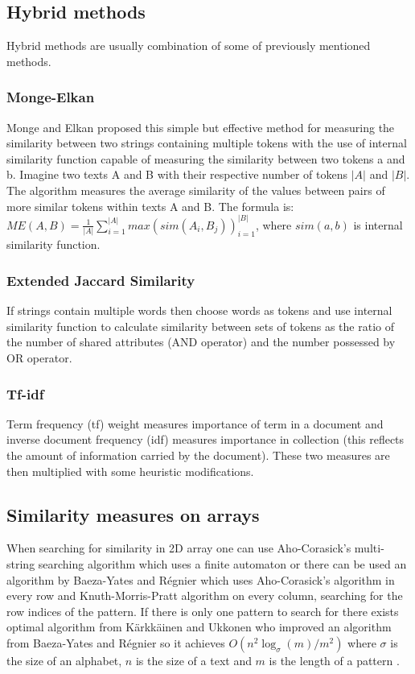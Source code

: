 \subsection{Hybrid methods}
Hybrid methods are usually combination of some of previously mentioned methods.
\subsubsection{Monge-Elkan}
Monge and Elkan proposed this simple but effective method for measuring the similarity between two strings containing multiple tokens with the use of internal similarity function capable of measuring the similarity between two tokens a and b. 
Imagine two texts A and B with their respective number of tokens $\lvert A \rvert$ and $\lvert B\rvert$. 
The algorithm measures the average similarity of the values between pairs of more similar tokens within texts A and B. 
The formula is: 
$ME(A,B)=\frac{1}{\lvert A \rvert} \sum_{i=1}^{\lvert A \rvert} max (sim(A_i, B_j))_{i=1}^{\lvert B\rvert}$, where $sim(a, b)$ is internal similarity function.
\subsubsection{Extended Jaccard Similarity}
If strings contain multiple words then choose words as tokens and use internal similarity function to calculate similarity between sets of tokens as the ratio of the number of shared attributes (AND operator) and the number possessed by OR operator.
\subsubsection{Tf-idf}
Term frequency (tf) weight measures importance of term in a document and inverse document frequency (idf) measures importance in collection (this reflects the amount of information carried by the document). These two measures are then multiplied with some heuristic modifications.

\subsection{Similarity measures on arrays}
When searching for similarity in 2D array one can use Aho-Corasick's multi-string searching algorithm \cite{ahocor} which uses a finite automaton or there can be used an algorithm by Baeza-Yates and R{\' e}gnier \cite{baeza1993fast} which uses Aho-Corasick's algorithm in every row and Knuth-Morris-Pratt algorithm on every column, searching for the row indices of the pattern. If there is only one pattern to search for there exists optimal algorithm from K{\"a}rkk{\"a}inen and Ukkonen who improved an algorithm from Baeza-Yates and R{\' e}gnier so it achieves $O(n^2 \log_\sigma (m) / m^2)$ where $\sigma$ is the size of an alphabet, $n$ is the size of a text and $m$ is the length of a pattern \cite{karkoptimal}. 

